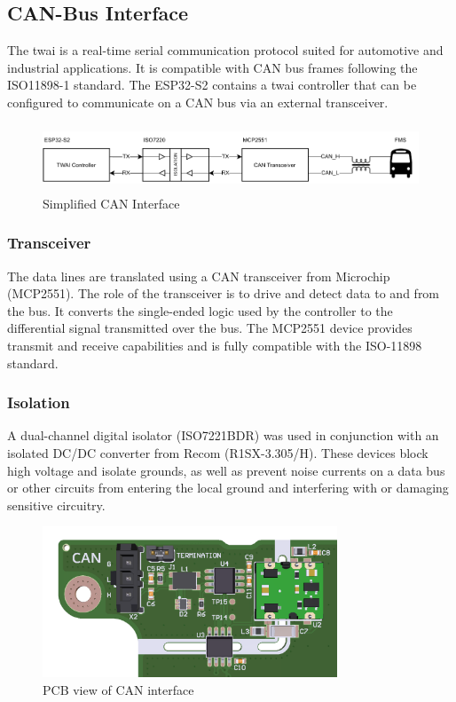 \subsection{CAN-Bus Interface}
The \acrfull{twai} is a real-time serial communication protocol suited for automotive and industrial applications. It is compatible with CAN bus frames following the ISO11898-1 standard. The ESP32-S2 contains a \acrshort{twai} controller that can be configured to communicate on a CAN bus via an external transceiver.

\begin{figure}[h!]
	\centering
	\includegraphics[height=2.0cm]{images/can-interface}
	\caption{Simplified CAN Interface}
	\label{fig:can-interface}
\end{figure}

\subsubsection{Transceiver}
The data lines are translated using a CAN transceiver from Microchip (MCP2551). The role of the transceiver is to drive and detect data to and from the bus. It converts the single-ended logic used by the controller to the differential signal transmitted over the bus. The MCP2551 device provides transmit and receive capabilities and is fully compatible with the ISO-11898 standard.
\newpage

\subsubsection{Isolation}
A dual-channel digital isolator (ISO7221BDR) was used in conjunction with an isolated DC/DC converter from Recom (R1SX-3.305/H). These devices block high voltage and isolate grounds, as well as prevent noise currents on a data bus or other circuits from entering the local ground and interfering with or damaging sensitive circuitry.

\begin{figure}[h!]
	\centering
	\includegraphics[height=4.5cm]{images/can-pcb}
	\caption{PCB view of CAN interface}
	\label{fig:can-pcb}
\end{figure}

